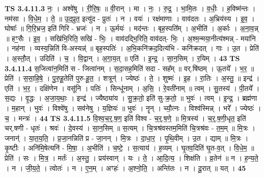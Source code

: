 \documentclass[17pt]{extarticle}
\begin{document}
                  \newline
                                \textbf{ TS 3.4.11.3} \newline
                  नः॒ । अश्वे॑षु । री॒रि॒षः॒ ॥ वी॒रान् । मा । नः॒ । रु॒द्र॒ । भा॒मि॒तः । व॒धीः॒ । ह॒विष्म॑न्तः । नम॑सा । वि॒धे॒म॒ । ते॒ ॥ उ॒द॒प्रुत॒ इत्यु॑द - प्रुतः॑ । न । वयः॑ । रक्ष॑माणाः । वाव॑दतः । अ॒भ्रिय॑स्य । इ॒व॒ । घोषाः᳚ ॥ गि॒रि॒भ्रज॒ इति॑ गिरि - भ्रजः॑ । न । ऊ॒र्मयः॑ । मद॑न्तः । बृह॒स्पति᳚म् । अ॒भीति॑ । अ॒र्काः । अ॒ना॒व॒न्न् ॥ हꣳ॒॒सैः । इ॒व॒ । सखि॑भि॒रिति॒ सखि॑ - भिः॒ । वाव॑दद्भि॒रिति॒ वाव॑दत्- भिः॒ । अ॒श्म॒न्मया॒नीत्य॑श्मन्न् - मया॑नि । नह॑ना । व्यस्य॒न्निति॑ वि-अस्यन्न्॑ ॥ बृह॒स्पतिः॑ । अ॒भि॒कनि॑क्रद॒दित्य॑भि - कनि॑क्रदत् । गाः । उ॒त । प्रेति॑ । अ॒स्तौ॒त् । उदिति॑ । च॒ । वि॒द्वान् । अ॒गा॒य॒त् ॥ एति॑ । इ॒न्द्र॒ । सा॒न॒सिम् । र॒यिम् । \textbf{  43} \newline
                  \newline
                                \textbf{ TS 3.4.11.4} \newline
                  स॒जित्वा॑न॒मिति॑ स - जित्वा॑नम् । स॒दा॒सह॒मिति॑ सदा - सह᳚म् ॥ वर्.षि॑ष्ठम् । ऊ॒तये᳚ । भ॒र॒ ॥ प्रेति॑ । स॒सा॒हि॒षे॒ । पु॒रु॒हू॒तेति॑ पुरु-हू॒त॒ । शत्रून्॑ । ज्येष्ठः॑ । ते॒ । शुष्मः॑ । इ॒ह । रा॒तिः । अ॒स्तु॒ ॥ इन्द्र॑ । एति॑ । भ॒र॒ । दक्षि॑णेन । वसू॑नि । पतिः॑ । सिन्धू॑नाम् । अ॒सि॒ । रे॒वती॑नाम् ॥ त्वम् । सु॒तस्य॑ । पी॒तये᳚ । स॒द्यः । वृ॒द्धः । अ॒जा॒य॒थाः॒ । इन्द्र॑ । ज्यैष्ठ्या॑य । सु॒क्र॒तो॒ इति॑ सु-क्र॒तो॒ ॥ भुवः॑ । त्वम् । इ॒न्द्र॒ । ब्रह्म॑णा । म॒हान् । भुवः॑ । विश्वे॑षु । सव॑नेषु । य॒ज्ञियः॑ ॥ भुवः॑ । नॄन् । च्यौ॒त्नः । विश्व॑स्मिन्न् । भरे᳚ । ज्येष्ठः॑ । च॒ । मन्त्रः॑ । \textbf{  44} \newline
                  \newline
                                \textbf{ TS 3.4.11.5} \newline
                  वि॒श्व॒च॒र्॒.ष॒ण॒ इति॑ विश्व - च॒र्॒.ष॒णे॒ ॥ मि॒त्रस्य॑ । च॒र्॒.ष॒णी॒धृत॒ इति॑ चर्.षणी - धृतः॑ । श्रवः॑ । दे॒वस्य॑ । सा॒न॒सिम् ॥ स॒त्यम् । चि॒त्रश्र॑वस्तम॒मिति॑ चि॒त्रश्र॑वः - त॒म॒म् ॥ मि॒त्रः । जनान्॑ । या॒त॒य॒ति॒ । प्र॒जा॒नन्निति॑ प्र - जा॒नन् । मि॒त्रः । दा॒धा॒र॒ । पृ॒थि॒वीम् । उ॒त । द्याम् ॥ मि॒त्रः । कृ॒ष्टीः । अनि॑मि॒षेत्यनि॑ - मि॒षा॒ । अ॒भीति॑ । च॒ष्टे॒ । स॒त्याय॑ । ह॒व्यम् । घृ॒तव॒दिति॑ घृ॒त-व॒त् । वि॒धे॒म॒ ॥ प्रेति॑ । सः । मि॒त्र॒ । मर्तः॑ । अ॒स्तु॒ । प्रय॑स्वान् । यः । ते॒ । आ॒दि॒त्य॒ । शिक्ष॑ति । व्र॒तेन॑ ॥ न । ह॒न्य॒ते॒ । न । जी॒य॒ते॒ । त्वोतः॑ । न । ए॒न॒म् । अꣳहः॑ । अ॒श्नो॒ति॒ । अन्ति॑तः । न । दू॒रात् ॥ यत् । \textbf{  45} \newline
\end{document}
